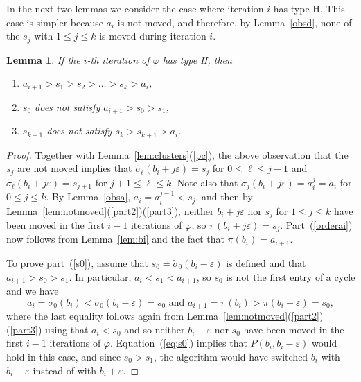 \documentclass[11pt]{amsart}
\newtheorem{lemma}[theorem]{Lemma}
\newcommand\beq{\begin{equation}}
\newcommand\eeq{\end{equation}}
\newcommand\ben{\begin{enumerate}}
\newcommand\een{\end{enumerate}}
\newcommand\wt{\widetilde}
\newcommand\bij{\varphi}
\newcommand\eps{\varepsilon}
\newcommand\sigm{\wt\sigma}
\begin{document}
In the next two lemmas we consider the case where iteration $i$ has type H. This case is simpler because $a_i$ is not moved, and therefore, by Lemma~\ref{obsd}, none of the $s_j$ with $1\le j\le k$ is moved during iteration $i$.

\begin{lemma}\label{lem:typeH1}
If the $i$-th iteration of $\bij$ has type H, then
\ben \item\label{orderai}
$a_{i+1}>s_1>s_2>\dots>s_k>a_i$, %
\item \label{s0} $s_0$ does not satisfy $a_{i+1}>s_0>s_1$,
\item \label{sk1} $s_{k+1}$ does not satisfy $s_k>s_{k+1}>a_i$.
\een
\end{lemma}


\begin{proof}
Together with Lemma~\ref{lem:clusters}(\ref{pc}), the above observation that the $s_j$ are not moved implies that $\sigm_\ell(b_i+j\eps)=s_j$ for $0\le\ell\le j-1$ and $\sigm_\ell(b_i+j\eps)=s_{j+1}$ for $j+1\le\ell\le k$.
Note also that $\sigm_j(b_i+j\eps)=a_i^j=a_i$ for $0\le j\le k$.
By Lemma~\ref{obsa}, $a_i=a_i^{j-1}<s_j$, and then by Lemma~\ref{lem:notmoved}(\ref{part2})(\ref{part3}), neither $b_i+j\eps$ nor $s_j$ for $1\le j\le k$
have been moved in the first $i-1$ iterations of $\bij$, so $\pi(b_i+j\eps)=s_j$. Part~(\ref{orderai}) now follows from Lemma~\ref{lem:bi} and the fact that $\pi(b_i)=a_{i+1}$.

To prove part~(\ref{s0}), assume that $s_0=\sigm_0(b_i-\eps)$ is defined and that $a_{i+1}>s_0>s_1$. In particular, $a_i<s_1<a_{i+1}$, so $s_0$ is not the first entry of a cycle and we have
\beq\label{eq:s0} a_i=\sigm_0(b_i)<\sigm_0(b_i-\eps)=s_0 \mbox{ and } a_{i+1}=\pi(b_i)>\pi(b_i-\eps)=s_0,\eeq
where the last equality follows again from Lemma~\ref{lem:notmoved}(\ref{part2})(\ref{part3}) using that $a_i<s_0$ and so neither $b_i-\eps$ nor $s_0$
have been moved in the first $i-1$ iterations of $\bij$.  Equation~(\ref{eq:s0}) implies that $P(b_i,b_i-\eps)$ would hold in this case, and since $s_0>s_1$,
the algorithm would have switched $b_i$ with $b_i-\eps$ instead of with $b_i+\eps$.


\end{proof}
\end{document}
